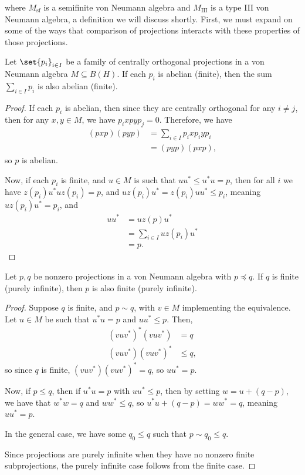 \documentclass[10pt]{mypackage}
\begin{document}
where $M_{\text{sf}}$ is a semifinite von Neumann algebra and $M_{\text{III}}$ is a type III von Neumann algebra, a definition we will discuss shortly. First, we must expand on some of the ways that comparison of projections interacts with these properties of those projections.
\begin{lemma}
  Let $\set{p_i}_{i\in I}$ be a family of centrally orthogonal projections in a von Neumann algebra $M\subseteq B(H)$. If each $p_i$ is abelian (finite), then the sum $\sum_{i\in I}p_i$ is also abelian (finite).
\end{lemma}
\begin{proof}
  If each $p_i$ is abelian, then since they are centrally orthogonal for any $i\neq j$, then for any $x,y\in M$, we have $p_ixpyp_j = 0$. Therefore, we have
  \begin{align*}
    \left( pxp \right)\left( pyp \right) &= \sum_{i\in I}p_ixp_iyp_i\\
                                         &= \left( pyp \right)\left( pxp \right),
  \end{align*}
  so $p$ is abelian.

  Now, if each $p_i$ is finite, and $u\in M$ is such that $uu^{\ast}\leq u^{\ast}u = p$, then for all $i$ we have $z\left( p_i \right)u^{\ast}uz\left( p_i \right) = p$, and $uz\left( p_i \right)u^{\ast} = z\left( p_i \right)uu^{\ast} \leq p_i$, meaning $uz\left( p_i \right)u^{\ast} = p_i$, and
  \begin{align*}
    uu^{\ast} &= uz(p)u^{\ast}\\
              &= \sum_{i\in I} uz\left( p_i \right)u^{\ast}\\
              &= p.
  \end{align*}
\end{proof}
\begin{proposition}
  Let $p,q$ be nonzero projections in a von Neumann algebra with $p\preceq q$. If $q$ is finite (purely infinite), then $p$ is also finite (purely infinite).
\end{proposition}
\begin{proof}
  Suppose $q$ is finite, and $p\sim q$, with $v\in M$ implementing the equivalence. Let $u\in M$ be such that $u^{\ast}u = p$ and $uu^{\ast}\leq p$. Then,
  \begin{align*}
    \left( vuv^{\ast} \right)^{\ast}\left( vuv^{\ast} \right) &= q\\
    \left( vuv^{\ast} \right)\left( vuv^{\ast} \right)^{\ast} &\leq q,
  \end{align*}
  so since $q$ is finite, $\left( vuv^{\ast}\right)\left( vuv^{\ast} \right)^{\ast} = q$, so $uu^{\ast} = p$.

  Now, if $p\leq q$, then if $u^{\ast}u = p$ with $uu^{\ast}\leq p$, then by setting $w = u + \left( q-p \right)$, we have that $w^{\ast}w = q$ and $ww^{\ast}\leq q$, so $u^{\ast}u + \left( q-p \right) = ww^{\ast} = q$, meaning $uu^{\ast} = p$.

  In the general case, we have some $q_0\leq q$ such that $p\sim q_0 \leq q$.

  Since projections are purely infinite when they have no nonzero finite subprojections, the purely infinite case follows from the finite case.
\end{proof}
\end{document}

